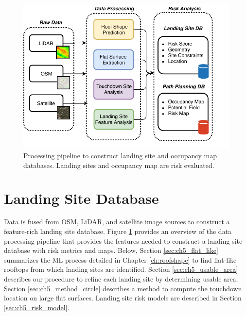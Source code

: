 \begin{figure}[!t]
    \centering
    \includegraphics[clip, trim=0.0cm 0cm 0cm 0cm, width=0.7\linewidth]{chapter_5_mapping/imgs/data_preprocessing-Page-1.pdf}
    \caption[Processing pipeline to construct landing site and occupancy map databases]{Processing pipeline to construct landing site and occupancy map databases. Landing sites and occupancy map are risk evaluated.}
    \label{fig:ch5_overview_processing}
\end{figure}

\section{Landing Site Database}\label{sec:ch5_landing_site_database}

 Data is fused from \ac{OSM}, LiDAR, and satellite image sources to construct a feature-rich landing site database. Figure \ref{fig:ch5_overview_processing} provides an overview of the data processing pipeline that provides the features needed to construct a landing site database with risk metrics and maps.
Below, Section \ref{sec:ch5_flat_like} summarizes the \ac{ML} process detailed in Chapter \ref{ch:roofshape} to find flat-like rooftops from which landing sites are identified. Section \ref{sec:ch5_usable_area} describes our procedure to refine each landing site by determining usable area. Section \ref{sec:ch5_method_circle} describes a method to compute the touchdown location on large flat surfaces. Landing site risk models are described in Section \ref{sec:ch5_risk_model}.

